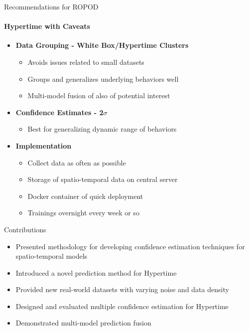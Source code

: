 \documentclass{beamer}
\begin{document}
\begin{frame}[t]{Recommendations for ROPOD}
  \framesubtitle{Hypertime with Caveats}
  \vspace*{-.25cm}

  \begin{itemize}
    \item \textbf{Data Grouping - White Box/Hypertime Clusters}
      \begin{itemize}
        \item Avoids issues related to small datasets
        \item Groups and generalizes underlying behaviors well
        \item Multi-model fusion of also of potential interest
      \end{itemize}

    \item \textbf{Confidence Estimates - 2$\sigma$}
      \begin{itemize}
        \item Best for generalizing dynamic range of behaviors
      \end{itemize}

    \item \textbf{Implementation}
      \begin{itemize}
        \item Collect data as often as possible
        \item Storage of spatio-temporal data on central server
        \item Docker container of quick deployment
        \item Trainings overnight every week or so
      \end{itemize}

  \end{itemize}

\end{frame}


\begin{frame}[t]{Contributions}

  \begin{itemize}
    \setlength\itemsep{1em}
        \item Presented methodology for developing confidence estimation techniques for spatio-temporal models

        \item Introduced a novel prediction method for Hypertime

        \item Provided new real-world datasets with varying noise and data density

        \item Designed and evaluated multiple confidence estimation for Hypertime

        \item Demonstrated multi-model prediction fusion

  \end{itemize}

\end{frame}
\end{document}
